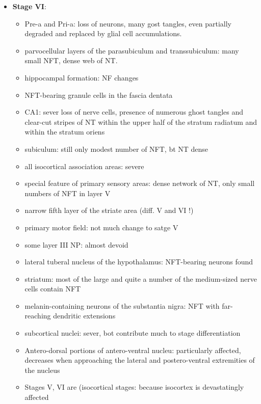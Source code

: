 \documentclass[fleqn]{article}\usepackage{caption}
\begin{document}
\begin{itemize}
\begin{itemize}
\item \textbf{Stage VI}:
\begin{itemize}
\item Pre-a and Pri-a: loss of neurons, many gost tangles, even partially degraded and replaced by glial cell accumulations. \item parvocellular layers of the parasubiculum and transsubiculum: many small NFT, dense web of NT.
\item hippocampal formation: NF changes 
\item NFT-bearing granule cells in the fascia dentata
\item CA1: sever loss of nerve cells, presence of numerous ghost tangles and clear-cut stripes of NT within the upper half of the stratum radiatum and within the stratum oriens 
\item subiculum: still only modest number of NFT, bt NT dense
\item all isocortical association areas: severe
\item special feature of primary sensory areas: dense network of NT, only small numbers of NFT in layer V 
\item narrow fifth layer of the striate area (diff.  V and VI !)
\item primary motor field: not much change to satge V
\item some layer III NP: almost devoid
\item lateral tuberal nucleus of the hypothalamus: NFT-bearing neurons found
\item striatum: most of the large and quite a number of the medium-sized nerve cells contain NFT
\item melanin-containing neurons of the substantia nigra: NFT with far-reaching dendritic extensions
 \item subcortical nuclei: sever, bot contribute much to stage differentiation
 \item Antero-dorsal portions of antero-ventral nucleu:  particularly affected, decreases when approaching the lateral and postero-ventral extremities of the nucleus 
\item Stages V, VI are (isocortical stages: because isocortex is devastatingly affected
\end{itemize}
\end{itemize}
\end{itemize}
\end{document}
